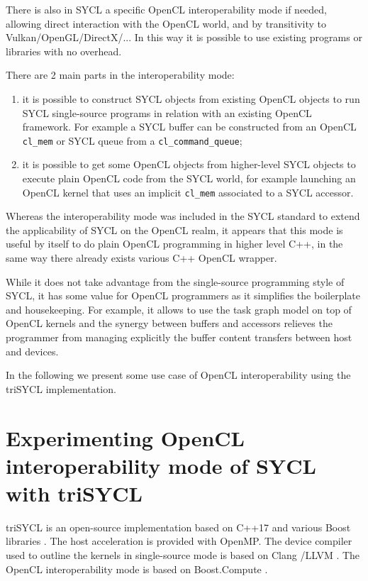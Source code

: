 \documentclass[sigplan, review, authordraft]{acmart}
\begin{document}
There is also in SYCL a specific OpenCL interoperability mode if
needed, allowing direct interaction with the OpenCL world, and by
transitivity to Vulkan/OpenGL/DirectX/... In this way it is possible
to use existing programs or libraries with no overhead.

There are 2 main parts in the interoperability mode:
\begin{enumerate}
\item it is possible to construct SYCL objects from existing OpenCL
  objects to run SYCL single-source programs in relation with an
  existing OpenCL framework. For example a SYCL buffer can be
  constructed from an OpenCL \lstinline|cl_mem| or SYCL queue from a
  \lstinline|cl_command_queue|;
\item it is possible to get some OpenCL objects from higher-level SYCL
  objects to execute plain OpenCL code from the SYCL world, for
  example launching an OpenCL kernel that uses an implicit
  \lstinline|cl_mem| associated to a SYCL accessor.
\end{enumerate}

Whereas the interoperability mode was included in the SYCL standard to
extend the applicability of SYCL on the OpenCL realm, it appears that
this mode is useful by itself to do plain OpenCL programming in higher
level C++, in the same way there already exists various C++ OpenCL
wrapper.

While it does not take advantage from the single-source programming
style of SYCL, it has some value for OpenCL programmers as it
simplifies the boilerplate and housekeeping. For example, it allows to
use the task graph model on top of OpenCL kernels and the synergy
between buffers and accessors relieves the programmer from managing
explicitly the buffer content transfers between host and devices.

In the following we present some use case of OpenCL interoperability
using the triSYCL implementation.


\section{Experimenting OpenCL interoperability mode of SYCL with
  triSYCL}
\label{sec:exper-with-opencl}

triSYCL \cite{triSYCL} is an open-source implementation based on C++17
and various Boost libraries \cite{Boost-1.63}. The host acceleration
is provided with OpenMP. The device compiler used to outline the
kernels in single-source mode is based on Clang \cite{Clang-4.0}/LLVM
\cite{LLVM-4.0}. The OpenCL interoperability mode is based on
Boost.Compute \cite{Boost.Compute}.
\end{document}

